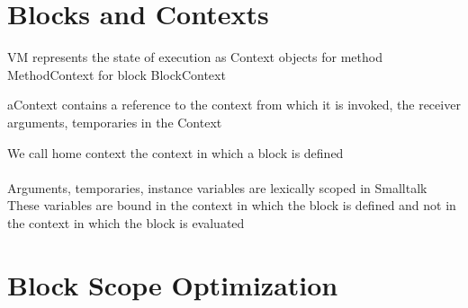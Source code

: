 \documentclass[a4paper,10pt,twoside]{book}
\begin{document}
\section{Blocks and Contexts}
VM represents the state of execution as Context objects
for method MethodContext
for block BlockContext

aContext contains a reference to the context from which it is invoked, the receiver arguments, temporaries in the Context

We call home context the context in which a block is defined


\paragraph{}
Arguments, temporaries, instance variables are lexically scoped in Smalltalk
These variables are bound in the context in which the block is defined and not in the context in which the block is evaluated




\section{Block Scope Optimization}



\ifx\wholebook\relax\else
   
   
\end{document}
